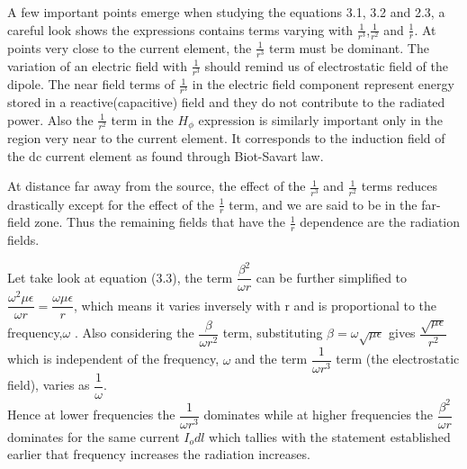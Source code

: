 A few important points emerge when studying the equations 3.1, 3.2 and 2.3, a careful look shows the expressions contains terms varying with $\frac{1}{r^3}$,$\frac{1}{r^2}$ and $\frac{1}{r}$. At points very close to the current element, the  $\frac{1}{r^3}$ term must be dominant. The variation of an electric field with  $\frac{1}{r^3}$ should remind us of electrostatic field of the dipole. The near field terms of  $\frac{1}{r^3}$ in the electric field component represent energy stored in a reactive(capacitive) field and they do not contribute to the radiated power. Also the  $\frac{1}{r^2}$ term in the $H_\phi$ expression is similarly important only in the region very near to the current element. It corresponds to the induction field of the dc current element as found through Biot-Savart law. 

At distance far away from the source, the effect of the  $\frac{1}{r^3}$ and  $\frac{1}{r^2}$ terms reduces drastically except for the effect of the  $\frac{1}{r}$ term, and we are said to be in the far-field zone. Thus the remaining fields that have the  $\frac{1}{r}$ dependence are the radiation fields. 

Let take look at equation (3.3), the term $\dfrac{\beta^2}{\omega r}$ can be further simplified to $\dfrac{\omega ^2\mu\epsilon}{\omega r} = \dfrac{\omega \mu \epsilon}{r}$, which means it varies inversely with r and is proportional to the frequency,$\omega$ . Also considering the $\dfrac{\beta}{\omega r^2}$ term, substituting $\beta = \omega \sqrt{\mu \epsilon}$ gives $\dfrac{\sqrt{\mu \epsilon}}{r^2}$ which is independent of the frequency, $\omega$ and the term $\dfrac{1}{\omega r^3}$ term (the electrostatic field), varies as $\dfrac{1}{\omega }$. \\ 
Hence at lower frequencies the $\dfrac{1}{\omega r^3}$ dominates while at higher frequencies the $\dfrac{\beta^2}{\omega r}$ dominates for the same current $I_odl$ which tallies with the statement established earlier that frequency increases the radiation increases. 

